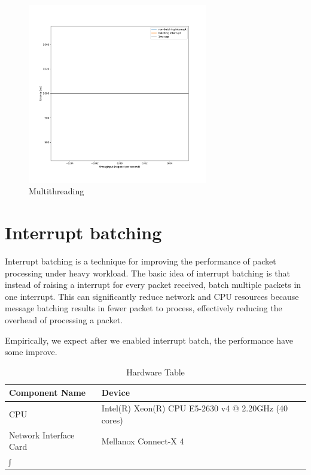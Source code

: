 \documentclass[bsc,frontabs,twoside,singlespacing,parskip,deptreport]{infthesis}     %
\begin{document}
\begin{figure}[h]
	\centering
	\includegraphics[width=0.7\textwidth,height=0.7\textheight,keepaspectratio]{figure/multithreading.pdf}
	\caption{Multithreading}
	\label{fig:threads}
\end{figure}






\section{Interrupt batching}
Interrupt batching is a technique for improving the performance of packet processing under heavy workload. The basic idea of interrupt batching is that instead of raising a interrupt for every packet received, batch multiple packets in one interrupt. This can significantly reduce network and CPU resources because message batching results in fewer packet to process, effectively reducing the overhead of processing a packet.

Empirically, we expect after we enabled interrupt batch, the performance have some improve.

\begin{table}
	\begin{tabular}{ |p{6cm}||p{6cm}|  }
	 \hline
	 Component Name & Device \\
	 \hline
	CPU & Intel(R) Xeon(R) CPU E5-2630 v4 @ 2.20GHz (40 cores) \\
	 \hline
	Network Interface Card & Mellanox Connect-X 4 \\
	 \hline∫
	\end{tabular}
	\caption{Hardware Table}
	\label{tab:hardware}	
\end{table}
\end{document}
